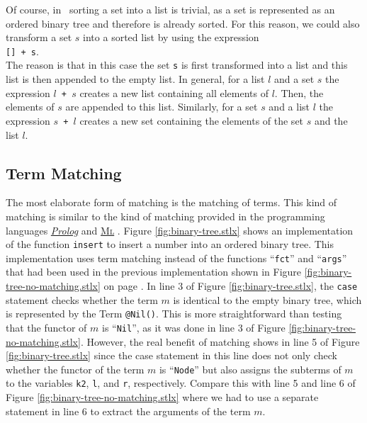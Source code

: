 Of course, in \setlx\ sorting a set into a list is trivial, as a
set is represented as an ordered binary tree and therefore is already sorted.
For this reason, we could also transform a set $s$ into a sorted list by using the expression
\\[0.2cm]
\hspace*{1.3cm}
\texttt{[] + s}.
\\[0.2cm]
The reason is that in this case the set \texttt{s} is first transformed into a list and this list is then appended
to the empty list.  In general, for a list $l$ and a set $s$ the expression \texttt{$l$ + $s$} creates a new
list containing all elements of $l$.  Then, the elements of $s$ are appended to this
list.  Similarly, for a set $s$ and a list $l$ the expression \texttt{$s$ + $l$} creates a new set
containing the elements of the set $s$ and the list $l$.  

\subsection{Term Matching}
The most elaborate form of matching is the matching of terms.  This kind of matching is similar to
the kind of matching provided in the programming languages 
\href{http://en.wikipedia.org/wiki/Prolog}{\textsl{Prolog}} and 
\href{http://en.wikipedia.org/wiki/ML_(programming_language)}{\textsc{Ml}} \cite{milner:90}.
Figure \ref{fig:binary-tree.stlx} shows an implementation of the function \texttt{insert} to insert
a number into an ordered binary tree.  This implementation uses
term matching instead of the functions ``\texttt{fct}'' and ``\texttt{args}'' that had been used in
the previous implementation shown in Figure \ref{fig:binary-tree-no-matching.stlx} on page
\pageref{fig:binary-tree-no-matching.stlx}.  In line 3 of Figure \ref{fig:binary-tree.stlx}, the
\texttt{case} statement checks whether the term $m$ is identical to the empty binary tree, which is
represented by the Term \texttt{@Nil()}.  This is more straightforward than
testing that the functor of $m$ is ``\texttt{Nil}'', as it was done in line 3 of Figure
\ref{fig:binary-tree-no-matching.stlx}.  However, the real benefit of matching shows in line 5 of
Figure \ref{fig:binary-tree.stlx} since the case statement in this line does not only check whether
the functor of the term $m$ is ``\texttt{Node}'' but also assigns the subterms of $m$ to the
variables \texttt{k2}, \texttt{l}, and \texttt{r}, respectively.  Compare this with line 5 and line 6 of Figure
\ref{fig:binary-tree-no-matching.stlx} where we had to use a separate statement in line 6 to extract
the arguments of the term $m$.


